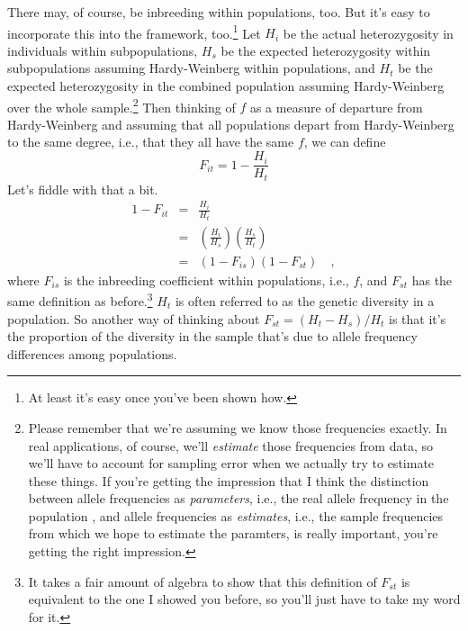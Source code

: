 There may, of course, be inbreeding within populations, too. But it's
easy to incorporate this into the framework, too.\footnote{At least
  it's easy once you've been shown how.} Let $H_i$ be the actual
heterozygosity in individuals within subpopulations, $H_s$ be the
expected heterozygosity within subpopulations assuming Hardy-Weinberg
within populations, and $H_t$ be the expected heterozygosity in the
combined population assuming Hardy-Weinberg over the whole
sample.\footnote{Please remember that we're assuming we know those
  frequencies exactly. In real applications, of course, we'll {\it
    estimate\/} those frequencies from data, so we'll have to account
  for sampling error when we actually try to estimate these things. If
  you're getting the impression that I think the distinction between
  allele frequencies as {\it parameters\/}, i.e., the real allele
  frequency in the population , and allele frequencies as {\it
    estimates\/}, i.e., the sample frequencies from which we hope to
  estimate the paramters, is really important, you're getting the
  right impression.}  Then thinking of $f$ as a measure of departure
from Hardy-Weinberg and assuming that all populations depart from
Hardy-Weinberg to the same degree, i.e., that they all have the same
$f$, we can define
\[
F_{it} = 1 - \frac{H_i}{H_t}
\]
Let's fiddle with that a bit.
\begin{eqnarray*}
1 - F_{it} &=& \frac{H_i}{H_t} \\
           &=& \left(\frac{H_i}{H_s}\right)\left(\frac{H_s}{H_t}\right) \\
           &=& (1 - F_{is})(1 - F_{st}) \quad ,
\end{eqnarray*}
where $F_{is}$ is the inbreeding coefficient within populations, i.e.,
$f$, and $F_{st}$ has the same definition as before.\footnote{It takes
  a fair amount of algebra to show that this definition of $F_{st}$ is
  equivalent to the one I showed you before, so you'll just have to
  take my word for it.} $H_t$ is often referred to as the genetic
diversity in a population. So another way of thinking about $F_{st} =
(H_t - H_s)/H_t$ is that it's the proportion of the diversity in the
sample that's due to allele frequency differences among populations.

